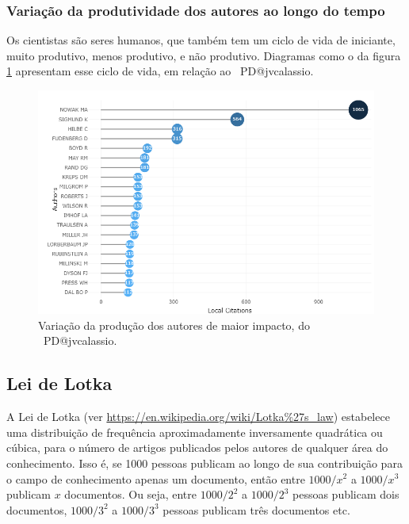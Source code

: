 \subsubsection{Variação da produtividade dos autores ao longo do tempo}

Os cientistas são seres humanos, que também tem um ciclo de vida de iniciante, muito produtivo, menos produtivo, e não produtivo.
Diagramas como o da figura \ref{fig:PD@jvcalassio:Author:TopAuthorsProductionOverTime} apresentam esse ciclo de vida, em relação ao \dataset\ PD@jvcalassio.

\begin{figure}
    \centering
    \includegraphics[width=1\textwidth]{exploratory-data-analysis/jvcalassio/PesqBibliogr/PrisonersDilemma/WoS-20221201/Dataset/MostRelevantAuthorsLocal-2022-12-03.png}
    \caption{Variação da produção dos autores de maior impacto, do \dataset\ PD@jvcalassio.}
    \label{fig:PD@jvcalassio:Author:TopAuthorsProductionOverTime}
\end{figure}

\subsection{Lei de Lotka}

A Lei de Lotka (ver \url{https://en.wikipedia.org/wiki/Lotka\%27s_law}) estabelece uma distribuição de frequência aproximadamente inversamente quadrática ou cúbica, para o número de artigos publicados pelos autores de qualquer área do conhecimento. Isso é, se 1000 pessoas publicam ao longo de sua contribuição para o campo de conhecimento apenas um documento, então
entre $1000/x^{2}$ a $1000/x^{3}$ publicam $x$ documentos. Ou seja, entre
$1000/2^{2}$ a $1000/2^{3}$ pessoas publicam dois documentos, $1000/3^{2}$ a $1000/3^{3}$ pessoas publicam três documentos etc.

